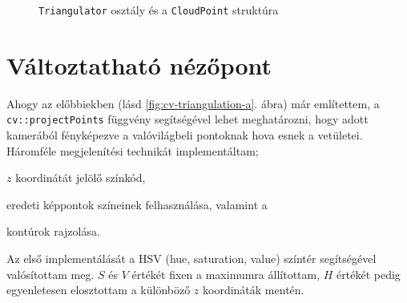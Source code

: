 \begin{figure}[tbh]
\centering


\caption{\texttt{Triangulator} osztály és a \texttt{CloudPoint} struktúra \label{fig:cd:triangulator}}
\end{figure}

\section{Változtatható nézőpont}

Ahogy az előbbiekben (lásd \ref{fig:cv-triangulation-a}. ábra) már említettem, a \texttt{cv::projectPoints} függvény segítségével lehet meghatározni, hogy adott kamerából fényképezve a valóvilágbeli pontoknak hova esnek a vetületei. Háromféle megjelenítési technikát implementáltam; \begin{inparaenum}[\itshape 1\upshape)]
\item $z$ koordinátát jelölő színkód,
\item eredeti képpontok színeinek felhasználása, valamint a
\item kontúrok rajzolása.
\end{inparaenum}

Az első implementálását a HSV (hue, saturation, value) színtér segítségével valósítottam meg. $S$ és $V$ értékét fixen a maximumra állítottam, $H$ értékét pedig egyenletesen elosztottam a különböző $z$ koordináták mentén.

